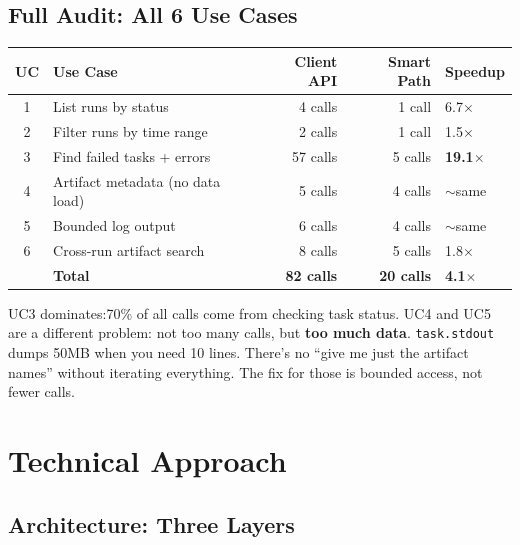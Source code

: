 \documentclass[11pt,a4paper]{article}
\begin{document}
\subsection{Full Audit: All 6 Use Cases}

\begin{center}
\begin{tabular}{clrrl}
\toprule
\textbf{UC} & \textbf{Use Case} & \textbf{Client API} & \textbf{Smart Path} & \textbf{Speedup} \\
\midrule
1 & List runs by status & 4 calls & 1 call & 6.7$\times$ \\
2 & Filter runs by time range & 2 calls & 1 call & 1.5$\times$ \\
3 & Find failed tasks + errors & 57 calls & 5 calls & \textbf{19.1$\times$} \\
4 & Artifact metadata (no data load) & 5 calls & 4 calls & $\sim$same \\
5 & Bounded log output & 6 calls & 4 calls & $\sim$same \\
6 & Cross-run artifact search & 8 calls & 5 calls & 1.8$\times$ \\
\midrule
& \textbf{Total} & \textbf{82 calls} & \textbf{20 calls} & \textbf{4.1$\times$} \\
\bottomrule
\end{tabular}
\end{center}

UC3 dominates:70\% of all calls come from checking task status. UC4 and UC5 are a different problem: not too many calls, but \textbf{too much data}. \texttt{task.stdout} dumps 50MB when you need 10 lines. There's no ``give me just the artifact names'' without iterating everything. The fix for those is bounded access, not fewer calls.


\section{Technical Approach}

\subsection{Architecture: Three Layers}
\end{document}
